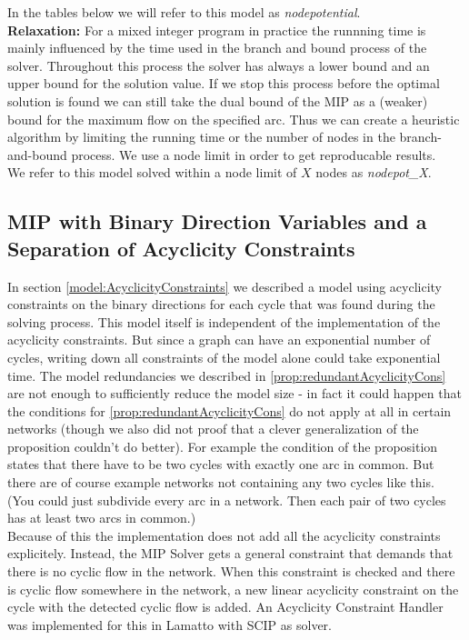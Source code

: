 In the tables below we will refer to this model as \textit{nodepotential}.\\
 
\textbf{Relaxation:} For a mixed 
integer program in practice the runnning time is mainly influenced by the time used in the branch and bound process
of the solver. Throughout this process the solver has always a lower bound and an upper bound for the solution value. 
If we stop this process before the optimal solution is found we can still take the dual bound of the MIP as a (weaker) 
bound for the maximum flow on the specified arc. Thus we can create a heuristic algorithm by limiting the running time 
or the number of nodes in the branch-and-bound process. We use a node limit in order to get reproducable results. \\

We refer to this model solved within a node limit of $X$ nodes as \textit{nodepot\_X}.
 
 
 \subsection{MIP with Binary Direction Variables and a Separation of Acyclicity Constraints}
In section \ref{model:AcyclicityConstraints} we described a model using acyclicity constraints on the binary directions 
for each cycle that was found during the solving process.
This model itself is independent of the implementation of the acyclicity constraints. But since a graph can have an 
exponential number of cycles, writing down all constraints of the model alone could take exponential time. The 
model redundancies we described in \ref{prop:redundantAcyclicityCons} are not enough to sufficiently reduce the model 
size - in fact it could happen that the conditions for \ref{prop:redundantAcyclicityCons} do not apply at all in 
certain networks (though we also did not proof that a clever generalization of the proposition couldn't do better). 
For example the condition of the proposition states that there have to be two cycles with exactly one arc in common. 
But there are of course example networks not containing any two cycles like this. (You could just subdivide every arc 
in a network. Then each pair of two cycles has at least two arcs in common.)\\

Because of this the implementation does not add all the acyclicity constraints explicitely. Instead, the MIP Solver 
gets a general constraint that demands that there is no cyclic flow in the network. When this constraint is checked and 
there is cyclic flow somewhere in the network, a new linear acyclicity constraint on the cycle with the detected cyclic 
flow is added. An Acyclicity Constraint Handler was implemented for this in Lamatto \cite{lamatto} with SCIP 
\cite{scip} \cite{Achterberg2009} as solver. \\

